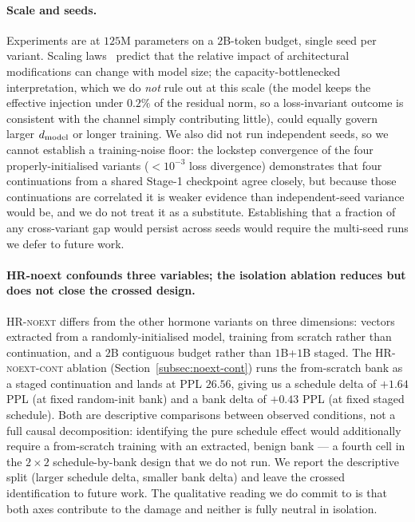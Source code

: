 \paragraph{Scale and seeds.} Experiments are at $125$M parameters on a $2$B-token budget, single seed per variant. Scaling laws~\citep{hoffmann2022training} predict that the relative impact of architectural modifications can change with model size; the capacity-bottlenecked interpretation, which we do \emph{not} rule out at this scale (the model keeps the effective injection under $0.2\%$ of the residual norm, so a loss-invariant outcome is consistent with the channel simply contributing little), could equally govern larger $d_{\text{model}}$ or longer training. We also did not run independent seeds, so we cannot establish a training-noise floor: the lockstep convergence of the four properly-initialised variants ($<10^{-3}$ loss divergence) demonstrates that four continuations from a shared Stage-1 checkpoint agree closely, but because those continuations are correlated it is weaker evidence than independent-seed variance would be, and we do not treat it as a substitute. Establishing that a fraction of any cross-variant gap would persist across seeds would require the multi-seed runs we defer to future work.

\paragraph{HR-noext confounds three variables; the isolation ablation reduces but does not close the crossed design.} \textsc{HR-noext} differs from the other hormone variants on three dimensions: vectors extracted from a randomly-initialised model, training from scratch rather than continuation, and a $2$B contiguous budget rather than $1$B+$1$B staged. The \textsc{HR-noext-cont} ablation (Section~\ref{subsec:noext-cont}) runs the from-scratch bank as a staged continuation and lands at PPL $26.56$, giving us a schedule delta of $+1.64$ PPL (at fixed random-init bank) and a bank delta of $+0.43$ PPL (at fixed staged schedule). Both are descriptive comparisons between observed conditions, not a full causal decomposition: identifying the pure schedule effect would additionally require a from-scratch training with an extracted, benign bank — a fourth cell in the $2 \times 2$ schedule-by-bank design that we do not run. We report the descriptive split (larger schedule delta, smaller bank delta) and leave the crossed identification to future work. The qualitative reading we do commit to is that both axes contribute to the damage and neither is fully neutral in isolation.

